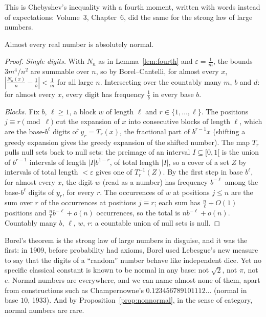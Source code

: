 This is Chebyshev's inequality with a fourth moment, written with words instead of expectations: Volume~3, Chapter~6, did the same for the strong
law of large numbers.

\begin{theorem}[Borel, 1909]\label{thm:borelnormal}
Almost every real number is absolutely normal.
\end{theorem}
\begin{proof}
\emph{Single digits.} With $N_n$ as in Lemma~\ref{lem:fourth} and $\varepsilon=\frac1m$, the bounds $3m^4/n^2$ are summable over $n$, so by Borel--Cantelli, for almost every $x$, $|\frac{N_n(x)}n-\frac1b|<\frac1m$ for
all large $n$. Intersecting over the countably many $m$, $b$ and $d$: for almost every $x$, every digit has frequency $\frac1b$ in every base $b$.

\emph{Blocks.} Fix $b$, $\ell\ge1$, a block $w$ of length $\ell$ and $r\in\{1,\dots,\ell\}$. The positions $j\equiv r\pmod\ell$ cut the expansion of $x$ into consecutive blocks of length $\ell$, which are
the base-$b^\ell$ digits of $y_r=T_r(x)$, the fractional part of $b^{r-1}x$ (shifting a greedy expansion gives the greedy expansion of the shifted number). The map $T_r$ pulls null sets
back to null sets: the preimage of an interval $I\subseteq[0,1[$ is the union of $b^{r-1}$ intervals of length $|I|b^{1-r}$, of total length $|I|$, so a cover of a set $Z$ by intervals of total
length $<\varepsilon$ gives one of $T_r^{-1}(Z)$. By the first step in base $b^\ell$, for almost every $x$, the digit $w$ (read as a number) has frequency $b^{-\ell}$ among the base-$b^\ell$
digits of $y_r$, for every $r$. The occurrences of $w$ at positions $j\le n$ are the sum over $r$ of the occurrences at positions $j\equiv r$; each sum has $\frac n\ell+O(1)$ positions and
$\frac n\ell b^{-\ell}+o(n)$ occurrences, so the total is $nb^{-\ell}+o(n)$. Countably many $b$, $\ell$, $w$, $r$: a countable union of null sets is null.
\end{proof}

\begin{beauty}
Borel's theorem is the strong law of large numbers in disguise, and it was the first: in 1909, before probability had
axioms, Borel used Lebesgue's new measure to say that the digits of a ``random'' number behave like independent dice.
Yet no specific classical constant is known to be normal in any base: not $\sqrt2$, not $\pi$, not $e$. Normal numbers
are everywhere, and we can name almost none of them, apart from constructions such as Champernowne's $0.123456789101112\ldots$ (normal
in base $10$, 1933). And by Proposition~\ref{prop:nonnormal}, in the sense of category, normal numbers are rare.
\end{beauty}

